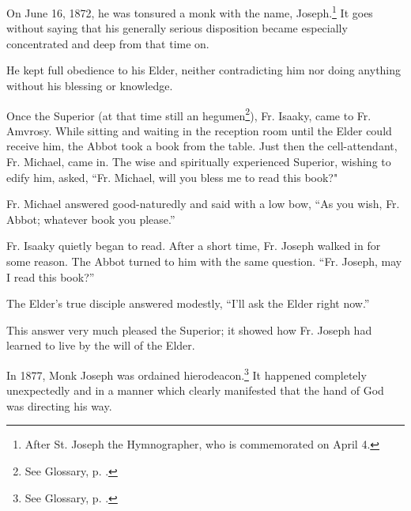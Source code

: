 On June 16, 1872, he was tonsured a monk with the name, Joseph.\footnote{After St. Joseph the Hymnographer, who is commemorated on April 4.} It goes without saying that his generally serious disposition became especially concentrated and deep from that time on.

He kept full obedience to his Elder, neither contradicting him nor doing anything without his blessing or knowledge.

Once the Superior (at that time still an hegumen\footnote{See Glossary, p. \pageref{hegumen}.}), Fr. Isaaky, came to Fr. Amvrosy. While sitting and waiting in the reception room until the Elder could receive him, the Abbot took a book from the table. Just then the cell-attendant, Fr. Michael, came in. The wise and spiritually experienced Superior, wishing to edify him, asked, “Fr. Michael, will you bless me to read this book?"

Fr. Michael answered good-naturedly and said with a low bow, “As you wish, Fr. Abbot; whatever book you please.”

Fr. Isaaky quietly began to read. After a short time, Fr. Joseph walked in for some reason. The Abbot turned to him with the same question. “Fr. Joseph, may I read this book?”

The Elder's true disciple answered modestly, “I'll ask the Elder right now.”

This answer very much pleased the Superior; it showed how Fr. Joseph had learned to live by the will of the Elder.

In 1877, Monk Joseph was ordained hierodeacon.\footnote{See Glossary, p. \pageref{hierodeacon}.} It happened completely unexpectedly and in a manner which clearly manifested that the hand of God was directing his way.

